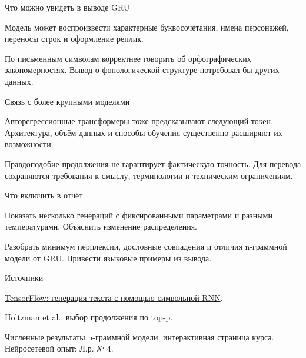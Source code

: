 \documentclass[aspectratio=169,12pt]{beamer}
\begin{document}
\begin{frame}{Что можно увидеть в выводе GRU}
\color{ink}
{\small Модель может воспроизвести характерные буквосочетания, имена персонажей, переносы строк и оформление реплик.
\par\vspace{0.6em}По письменным символам корректнее говорить об орфографических закономерностях. Вывод о фонологической структуре потребовал бы других данных.}
\end{frame}

\begin{frame}{Связь с более крупными моделями}
\color{ink}
{\small Авторегрессионные трансформеры тоже предсказывают следующий токен. Архитектура, объём данных и способы обучения существенно расширяют их возможности.
\par\vspace{0.6em}Правдоподобие продолжения не гарантирует фактическую точность. Для перевода сохраняются требования к смыслу, терминологии и техническим ограничениям.}
\end{frame}

\begin{frame}{Что включить в отчёт}
\color{ink}
{\small Показать несколько генераций с фиксированными параметрами и разными температурами. Объяснить изменение распределения.
\par\vspace{0.6em}Разобрать минимум перплексии, дословные совпадения и отличия n-граммной модели от GRU. Привести языковые примеры из вывода.}

\end{frame}
\color{ink}
\begin{frame}{Источники}
\color{ink}
{\small \href{https://www.tensorflow.org/text/tutorials/text_generation}{TensorFlow: генерация текста с помощью символьной RNN}.
\par\vspace{0.6em}\href{https://arxiv.org/abs/1904.09751}{Holtzman et al.: выбор продолжения по top-p}.
\par\vspace{0.6em}Численные результаты n-граммной модели: интерактивная страница курса. Нейросетевой опыт: Л.р. № 4.}
\end{frame}
\end{document}
